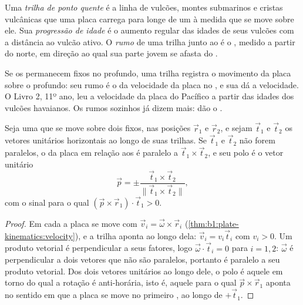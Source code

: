 \begin{definition}\label{def:b1:hotspots:track}
Uma \emph{trilha de ponto quente} é a linha de vulcões, montes submarinos e cristas vulcânicas que uma placa carrega para longe de um  à medida que se move sobre ele. Sua \emph{progressão de idade} é o aumento regular das idades de seus vulcões com a distância ao vulcão ativo. O \emph{rumo} de uma trilha junto ao  é o , medido a partir do norte, em direção ao qual sua parte jovem se afasta do .
\end{definition}

Se os  permanecem fixos no  profundo, uma trilha registra o movimento da placa sobre o  profundo: seu rumo é o da velocidade da placa no , e sua  dá a velocidade. O Livro 2, 11º ano, leu a velocidade da placa do Pacífico a partir das idades dos vulcões havaianos. Os rumos sozinhos já dizem mais: dão o .

\begin{proposition}\label{prop:b1:hotspots:two-tracks}
Seja uma  que se move sobre dois  fixos, nas posições $\vec r_1$ e $\vec r_2$, e sejam $\vec t_1$ e $\vec t_2$ os vetores unitários horizontais ao longo de suas trilhas. Se $\vec t_1$ e $\vec t_2$ não forem paralelos, o  da placa em relação aos  é paralelo a $\vec t_1\times\vec t_2$, e seu polo é o vetor unitário
\[
  \vec p = \pm\frac{\vec t_1\times\vec t_2}{\lVert\vec t_1\times\vec t_2\rVert},
\]
com o sinal para o qual $(\vec p\times\vec r_1)\cdot\vec t_1 > 0$.
\end{proposition}

\begin{proof}
Em cada  a placa se move com $\vec v_i = \vec\omega\times\vec r_i$
(\cref{thm:b1:plate-kinematics:velocity}), e a trilha aponta ao longo dela:
$\vec v_i = v_i\vec t_i$ com $v_i > 0$. Um produto vetorial é perpendicular a seus fatores, logo $\vec\omega\cdot\vec t_i = 0$ para $i = 1, 2$: $\vec\omega$ é perpendicular a dois vetores que não são paralelos, portanto é paralelo a seu produto vetorial. Dos dois vetores unitários ao longo dele, o polo é aquele em torno do qual a rotação é anti-horária, isto é, aquele para o qual
$\vec p\times\vec r_1$ aponta no sentido em que a placa se move no primeiro , ao longo de $+\vec t_1$.
\end{proof}

